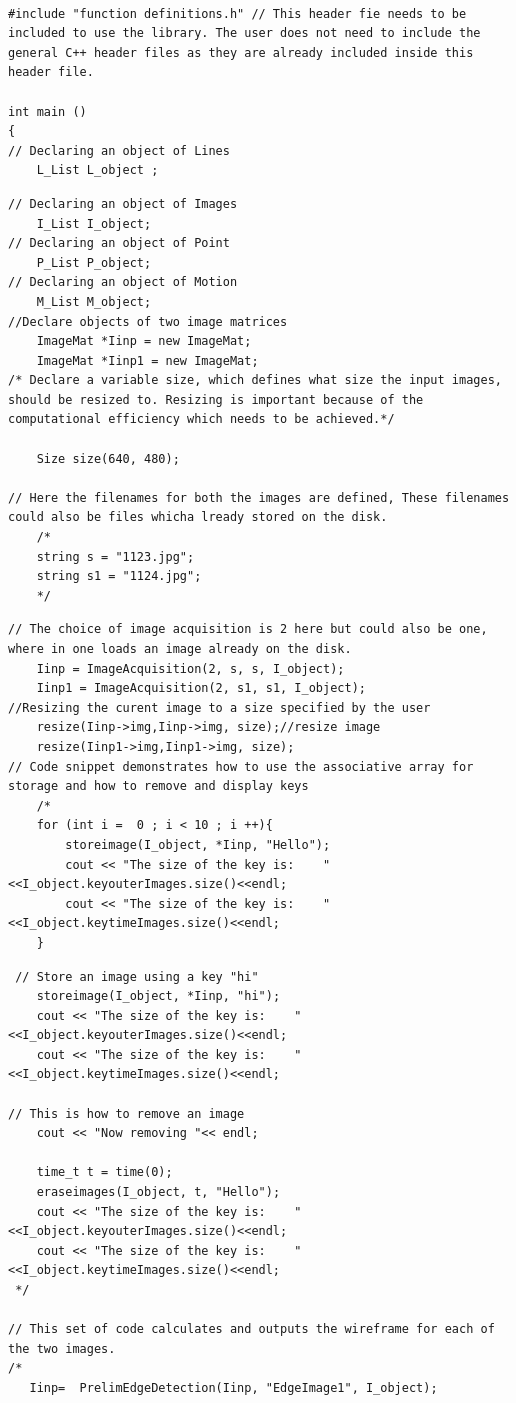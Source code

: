 \begin{lstlisting}

#include "function definitions.h" // This header fie needs to be included to use the library. The user does not need to include the general C++ header files as they are already included inside this header file. 

int main ()
{	
// Declaring an object of Lines
	L_List L_object ;
	\end{lstlisting}
\pagebreak
\begin{lstlisting}
// Declaring an object of Images
	I_List I_object;
// Declaring an object of Point
	P_List P_object;
// Declaring an object of Motion
	M_List M_object;
//Declare objects of two image matrices 
   	ImageMat *Iinp = new ImageMat;
    ImageMat *Iinp1 = new ImageMat;
/* Declare a variable size, which defines what size the input images, should be resized to. Resizing is important because of the computational efficiency which needs to be achieved.*/

 	Size size(640, 480);
    
// Here the filenames for both the images are defined, These filenames could also be files whicha lready stored on the disk.
	/*
	string s = "1123.jpg";
	string s1 = "1124.jpg";
	*/
	\end{lstlisting}
\pagebreak
\begin{lstlisting}
// The choice of image acquisition is 2 here but could also be one, where in one loads an image already on the disk. 
	Iinp = ImageAcquisition(2, s, s, I_object);
	Iinp1 = ImageAcquisition(2, s1, s1, I_object);
//Resizing the curent image to a size specified by the user
	resize(Iinp->img,Iinp->img, size);//resize image
	resize(Iinp1->img,Iinp1->img, size);
// Code snippet demonstrates how to use the associative array for storage and how to remove and display keys 
	/*
    for (int i =  0 ; i < 10 ; i ++){
		storeimage(I_object, *Iinp, "Hello");
 		cout << "The size of the key is:    "<<I_object.keyouterImages.size()<<endl;
       	cout << "The size of the key is:    "<<I_object.keytimeImages.size()<<endl; 
    }
\end{lstlisting}
\pagebreak
\begin{lstlisting}
 // Store an image using a key "hi"
	storeimage(I_object, *Iinp, "hi");
	cout << "The size of the key is:    "<<I_object.keyouterImages.size()<<endl;
    cout << "The size of the key is:    "<<I_object.keytimeImages.size()<<endl; 

// This is how to remove an image
  	cout << "Now removing "<< endl;

    time_t t = time(0);
   	eraseimages(I_object, t, "Hello");
	cout << "The size of the key is:    "<<I_object.keyouterImages.size()<<endl;
    cout << "The size of the key is:    "<<I_object.keytimeImages.size()<<endl; 
 */

// This set of code calculates and outputs the wireframe for each of the two images.
/*
   Iinp=  PrelimEdgeDetection(Iinp, "EdgeImage1", I_object);
\end{lstlisting}
